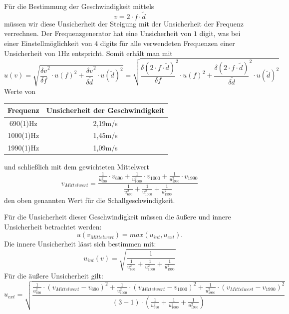 \documentclass{article}
\begin{document}
Für die Bestimmung der Geschwindigkeit mittels 
\begin{equation}
v = 2 \cdot f \cdot \widetilde{d}
\end{equation}
müssen wir diese Unsicherheit der Steigung mit der Unsicherheit der Frequenz verrechnen. 
Der Frequenzgenerator hat eine Unsicherheit von $1$ digit, was bei einer Einstellmöglichkeit von $4$ digits für alle verwendeten Frequenzen einer Unsicherheit von 1Hz entspricht.
Somit erhält man mit
\begin{equation}
u(v) = \sqrt{\frac{\delta v}{\delta f}^2 \cdot u(f)^2 + \frac{\delta v}{\delta\widetilde{d}}^2 \cdot u(\widetilde{d})^2} = \sqrt{\frac{\delta (2 \cdot f \cdot \widetilde{d})}{\delta f}^2 \cdot u(f)^2 + \frac{\delta (2 \cdot f \cdot \widetilde{d})}{\delta\widetilde{d}}^2 \cdot u(\widetilde{d})^2}
\end{equation}
Werte von
\begin{center}
\begin{tabular}{|c|c|}
\hline 
Frequenz & Unsicherheit der Geschwindigkeit \\ 
\hline 
690(1)Hz & 2,19m/s \\ 
\hline 
1000(1)Hz & 1,45m/s \\ 
\hline 
1990(1)Hz & 1,09m/s \\ 
\hline 
\end{tabular} 
\end{center}
und schließlich mit dem gewichteten Mittelwert
\begin{equation}
v_{Mittelwert} = \frac{\frac{1}{u_{690}^2} \cdot v_{690} + \frac{1}{u_{1000}^2} \cdot v_{1000} + \frac{1}{u_{1990}^2} \cdot v_{1990}}{\frac{1}{u_{690}^2} + \frac{1}{u_{1000}^2} + \frac{1}{u_{1990}^2}}
\end{equation}
den oben genannten Wert für die Schallgeschwindigkeit.

Für die Unsicherheit dieser Geschwindigkeit müssen die äußere und innere Unsicherheit betrachtet werden:
\begin{equation}
u(v_{Mittelwert}) = max(u_{int}, u_{ext}).
\end{equation}
Die innere Unsicherheit lässt sich bestimmen mit:
\begin{equation}
u_{int}(v) = \sqrt{\frac{1}{\frac{1}{u_{690}^2} + \frac{1}{u_{1000}^2} + \frac{1}{u_{1990}^2}}}
\end{equation}
Für die äußere Unsicherheit gilt:
\begin{equation}
u_{ext} = \sqrt{\frac{\frac{1}{u_{690}^2}\cdot(v_{Mittelwert} - v_{690})^2+ \frac{1}{u_{1000}^2}\cdot(v_{Mittelwert} - v_{1000})^2 + \frac{1}{u_{1990}^2}\cdot(v_{Mittelwert} - v_{1990})^2}{(3-1)\cdot (\frac{1}{u_{690}^2} + \frac{1}{u_{1000}^2} + \frac{1}{u_{1990}^2})}}
\end{equation}
\end{document}

